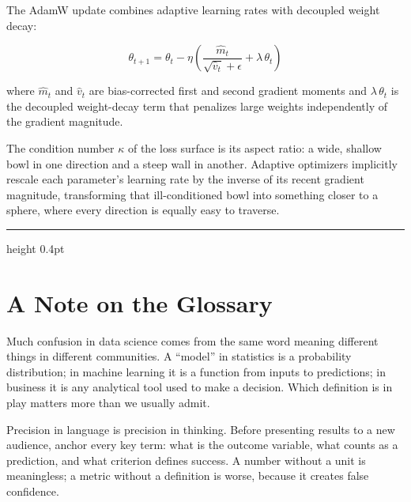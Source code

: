 \documentclass[12pt,a4paper]{article}
\begin{document}
The AdamW update combines adaptive learning rates with decoupled weight
decay:

\begin{equation*}
  \theta_{t+1} = \theta_t
  - \eta\!\left(\frac{\hat{m}_t}{\sqrt{\hat{v}_t} + \epsilon}
    + \lambda\,\theta_t\right)
\end{equation*}

where $\hat{m}_t$ and $\hat{v}_t$ are bias-corrected first and second
gradient moments and $\lambda\,\theta_t$ is the decoupled weight-decay
term that penalizes large weights independently of the gradient magnitude.

\begin{mentalmodel}
The condition number $\kappa$ of the loss surface is its aspect ratio:
a wide, shallow bowl in one direction and a steep wall in another.
Adaptive optimizers implicitly rescale each parameter's learning rate by
the inverse of its recent gradient magnitude, transforming that
ill-conditioned bowl into something closer to a sphere, where every
direction is equally easy to traverse.
\end{mentalmodel}

\vspace{10pt}\hrule height 0.4pt\vspace{14pt}

\section*{A Note on the Glossary}

Much confusion in data science comes from the same word meaning different
things in different communities. A ``model'' in statistics is a probability
distribution; in machine learning it is a function from inputs to
predictions; in business it is any analytical tool used to make a decision.
Which definition is in play matters more than we usually admit.

\begin{concept}
Precision in language is precision in thinking. Before presenting results
to a new audience, anchor every key term: what is the outcome variable,
what counts as a prediction, and what criterion defines success. A number
without a unit is meaningless; a metric without a definition is worse,
because it creates false confidence.
\end{concept}
\end{document}
